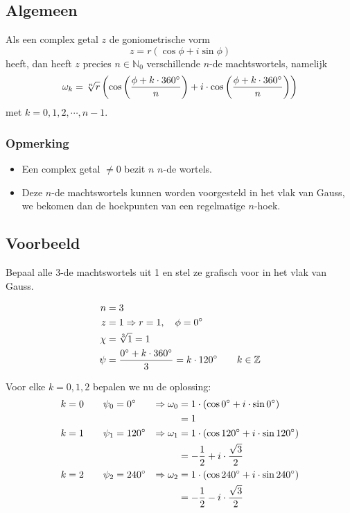 \documentclass[12pt,twoside,a4paper]{article}
\begin{document}
\subsection{Algemeen}

Als een complex getal $z$ de goniometrische vorm
\[ z = r ( \cos \phi + i \sin \phi )\]
heeft, dan heeft $z$ precies $n\in\mathbb{N}_0$ verschillende $n$-de machtswortels, namelijk
\[ \omega_k = \sqrt[n]{r}\left( \cos\left( \dfrac{\phi + k \cdot 360^\circ}{n} \right) + i \cdot \cos\left( \dfrac{\phi + k \cdot 360^\circ}{n} \right) \right)\]
met $k = 0, 1, 2, \cdots , n-1$.

\subsubsection*{Opmerking}
\begin{itemize}
\item Een complex getal $\neq 0$ bezit $n$ $n$-de wortels.
\item Deze $n$-de machtswortels kunnen worden voorgesteld in het vlak van Gauss, we bekomen dan de hoekpunten van een regelmatige $n$-hoek.
\end{itemize}

\subsection{Voorbeeld}

Bepaal alle $3$-de machtswortels uit 1 en stel ze grafisch voor in het vlak van Gauss.

\begin{align*}
  n &= 3\\
  z &= 1 \Rightarrow r = 1, \quad \phi = 0^\circ\\
  \chi &= \sqrt[3]{1} = 1\\
  \psi &= \dfrac{0^\circ + k \cdot 360^\circ}{3} = k \cdot 120^\circ \qquad k\in\mathbb{Z}
\end{align*}

Voor elke $k=0, 1, 2$ bepalen we nu de oplossing:
\begin{align*}
  k=0 \qquad \psi_0 &= 0^\circ   &\Rightarrow \omega_0 &= 1 \cdot (\cos 0^\circ + i \cdot \sin 0^\circ)\\
            &             &       &= 1\\
  k=1 \qquad \psi_1 &= 120^\circ &\Rightarrow \omega_1 &= 1 \cdot (\cos 120^\circ + i \cdot \sin 120^\circ)\\
            &             &       &= -\dfrac{1}{2} + i \cdot \dfrac{\sqrt{3}}{2}\\
  k=2 \qquad \psi_2 &= 240^\circ &\Rightarrow \omega_2 &= 1 \cdot (\cos 240^\circ + i \cdot \sin 240^\circ)\\
            &             &       &= -\dfrac{1}{2} - i \cdot \dfrac{\sqrt{3}}{2}\\
\end{align*}
\end{document}
